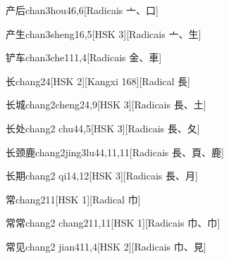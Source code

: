\begin{entry}{产后}{chan3hou4}{6,6}[Radicais ⼇、⼝]
\end{entry}

\begin{entry}{产生}{chan3sheng1}{6,5}[HSK 3][Radicais ⼇、⽣]
\end{entry}

\begin{entry}{铲车}{chan3che1}{11,4}[Radicais ⾦、⾞]
\end{entry}

\begin{entry}{长}{chang2}{4}[HSK 2][Kangxi 168][Radical ⾧]
\end{entry}

\begin{entry}{长城}{chang2cheng2}{4,9}[HSK 3][Radicais ⾧、⼟]
\end{entry}

\begin{entry}{长处}{chang2 chu4}{4,5}[HSK 3][Radicais ⾧、⼡]
\end{entry}

\begin{entry}{长颈鹿}{chang2jing3lu4}{4,11,11}[Radicais ⾧、⾴、⿅]
\end{entry}

\begin{entry}{长期}{chang2 qi1}{4,12}[HSK 3][Radicais ⾧、⽉]
\end{entry}

\begin{entry}{常}{chang2}{11}[HSK 1][Radical ⼱]
\end{entry}

\begin{entry}{常常}{chang2 chang2}{11,11}[HSK 1][Radicais ⼱、⼱]
\end{entry}

\begin{entry}{常见}{chang2 jian4}{11,4}[HSK 2][Radicais ⼱、⾒]
\end{entry}

